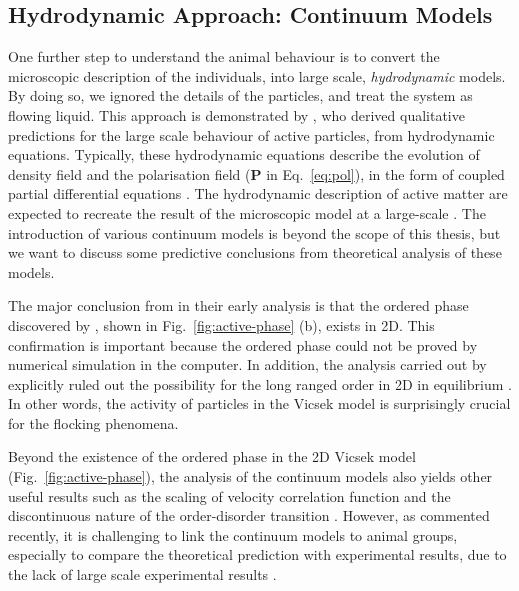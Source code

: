 \documentclass[11pt,twoside]{report}
\begin{document}
\subsection{Hydrodynamic Approach: Continuum Models}

One further step to understand the animal behaviour is to convert the microscopic description of the individuals, into large scale, \emph{hydrodynamic} models. By doing so, we ignored the details of the particles, and treat the system as flowing liquid.
This approach is demonstrated by \citeauthor{toner1995}, who derived qualitative predictions for the large scale behaviour of active particles, from hydrodynamic equations.
Typically, these hydrodynamic equations describe the evolution of density field and the polarisation field ($\mathbf{P}$ in Eq.~\ref{eq:pol}), in the form of coupled partial differential equations \cite{toner1995, toner1998, shaebani2019}.
The hydrodynamic description of active matter are expected to recreate the result of the microscopic model at a large-scale \cite{mahault2019}.
The introduction of various continuum models is beyond the scope of this thesis, but we want to discuss some predictive conclusions from theoretical analysis of these models.

The major conclusion from \citeauthor{toner1995} in their early analysis is that the ordered phase discovered by \citeauthor{vicsek1995}, shown in Fig.~\ref{fig:active-phase} (b), exists in 2D. This confirmation is important because the ordered phase could not be proved by numerical simulation in the computer.
In addition, the analysis carried out by \citeauthor{mermin1966} \cite{mermin1966} explicitly ruled out the possibility for the long ranged order in 2D in equilibrium \cite{sethna2006, ginelli2016}.
In other words, the activity of particles in the Vicsek model is surprisingly crucial for the flocking phenomena.

Beyond the existence of the ordered phase in the 2D Vicsek model (Fig.~\ref{fig:active-phase}), the analysis of the continuum models also yields other useful results such as the scaling of velocity correlation function and the discontinuous nature of the order-disorder transition \cite{solon2015, martin2021}. However, as \citeauthor{ouellette2022} commented recently, it is challenging to link the continuum models to animal groups, especially to compare the theoretical prediction with experimental results, due to the lack of large scale experimental results \cite{ouellette2022}.
\end{document}
